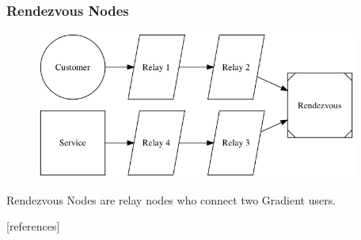 \documentclass{article}
\begin{document}
\subsubsection{Rendezvous Nodes}

\begin{figure}[htbp]
  \centering
  \includegraphics[width = 300pt]{sttRttc}
  \caption{}
\end{figure}

Rendezvous Nodes are relay nodes who connect two Gradient users.

[references]
\end{document}
